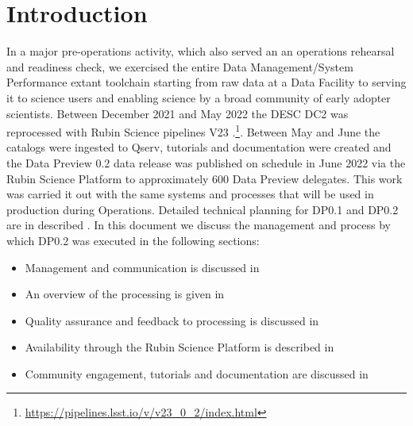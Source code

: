 \section{Introduction}\label{sec:intro}

In a major pre-operations activity, which also served an an operations rehearsal and readiness check, we exercised the entire Data Management/System Performance extant toolchain starting from raw data at a Data Facility to serving it to science users and enabling science by a broad community of early adopter scientists. 
Between December 2021 and May 2022 the DESC DC2 \citep{2021ApJS..253...31L} was reprocessed with Rubin Science pipelines V23 .\footnote{\url{https://pipelines.lsst.io/v/v23_0_2/index.html}}.
Between May and June the catalogs were ingested to Qserv, tutorials and documentation were created and the Data Preview 0.2 data release was published on schedule in June 2022 via the Rubin Science Platform to approximately 600 Data Preview delegates.
This work was carried it out with the same systems and processes that will be used in production during Operations.
Detailed technical planning for DP0.1 and DP0.2 are in described .
In this document we discuss the management and process by which DP0.2 was executed in the following sections:

\begin{itemize}
\item Management and communication is discussed in 
\item An overview of the processing is given in 
\item Quality assurance and feedback to processing is discussed in  
\item Availability through the Rubin Science Platform is described in 
\item Community engagement, tutorials and documentation are discussed in 
\end{itemize}
